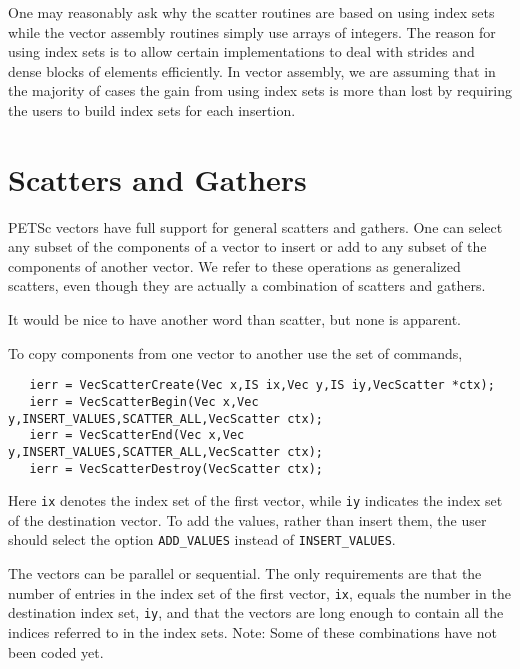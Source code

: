 \begin{design}
One may reasonably ask why the scatter routines are based on 
using index sets while the vector assembly routines simply use 
arrays of integers. The reason for using index sets is to allow certain 
implementations to deal with strides and dense blocks of elements 
efficiently. In vector assembly, we are assuming that in the majority of 
cases the gain from using index sets is more than lost by requiring 
the users to build index sets for each insertion. 
\end{design}

\section{Scatters and Gathers}  
\label{sec:scatter}

PETSc vectors have full support for general scatters and 
gathers. One can select any subset of the components of a vector to
insert or add to any subset of the components of another vector.
We refer to these operations as generalized scatters, even though they are 
actually a combination of scatters and gathers. 

\begin{design}
It would be nice to have another word than scatter, but none is apparent.
\end{design}

To copy  
components  
from one vector  
to another use the set of commands,
\begin{verbatim}
   ierr = VecScatterCreate(Vec x,IS ix,Vec y,IS iy,VecScatter *ctx);
   ierr = VecScatterBegin(Vec x,Vec y,INSERT_VALUES,SCATTER_ALL,VecScatter ctx);
   ierr = VecScatterEnd(Vec x,Vec y,INSERT_VALUES,SCATTER_ALL,VecScatter ctx);
   ierr = VecScatterDestroy(VecScatter ctx);
\end{verbatim} 
Here {\tt ix} denotes the index set of the first vector, while {\tt iy} 
indicates the index set of the destination vector.
To add the values, rather than insert them, the user should select
 the option
{\tt ADD\_VALUES}  instead of {\tt INSERT\_VALUES}.

The vectors can be parallel or sequential.  The only 
requirements are that the number of entries in the index set of the
first vector, {\tt ix}, equals the number in the destination index set, 
{\tt iy}, and that the vectors are long enough to contain all the indices 
referred to in the index sets.
Note: Some of these combinations have not been coded yet.

